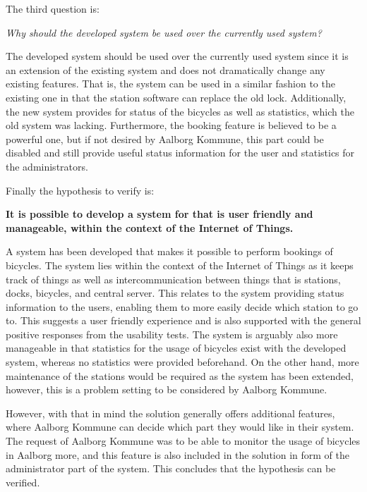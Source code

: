 The third question is:
\begin{center}
	\textit{Why should the developed system be used over the currently used system?}
\end{center}

The developed system should be used over the currently used system since it is an extension of the existing system and does not dramatically change any existing features.
That is, the system can be used in a similar fashion to the existing one in that the station software can replace the old lock. 
Additionally, the new system provides for status of the bicycles as well as statistics, which the old system was lacking. 
Furthermore, the booking feature is believed to be a powerful one, but if not desired by Aalborg Kommune, this part could be disabled and still provide useful status information for the user and statistics for the administrators.

Finally the hypothesis to verify is:
\begin{center}
	\textbf{It is possible to develop a system for \bycykel that is user friendly and manageable, within the context of the Internet of Things.}
\end{center}

A system has been developed that makes it possible to perform bookings of bicycles.
The system lies within the context of the Internet of Things as it keeps track of things as well as intercommunication between things that is stations, docks, bicycles, and central server.
This relates to the system providing status information to the users, enabling them to more easily decide which station to go to.
This suggests a user friendly experience and is also supported with the general positive responses from the usability tests.
The system is arguably also more manageable in that statistics for the usage of bicycles exist with the developed system, whereas no statistics were provided beforehand.
On the other hand, more maintenance of the stations would be required as the system has been extended, however, this is a problem setting to be considered by Aalborg Kommune.
 
However, with that in mind the solution generally offers additional features, where Aalborg Kommune can decide which part they would like in their system.
The request of Aalborg Kommune was to be able to monitor the usage of bicycles in Aalborg more, and this feature is also included in the solution in form of the administrator part of the system.
This concludes that the hypothesis can be verified.